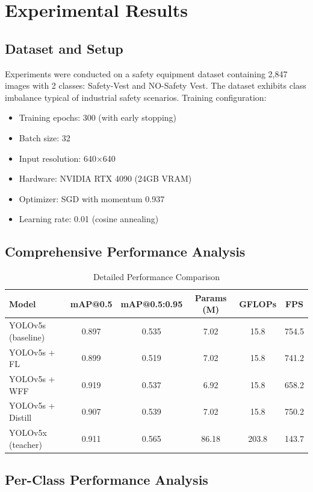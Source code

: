 \documentclass[journal]{IEEEtran}
\begin{document}
\section{Experimental Results}

\subsection{Dataset and Setup}

Experiments were conducted on a safety equipment dataset containing 2,847 images with 2 classes: Safety-Vest and NO-Safety Vest. The dataset exhibits class imbalance typical of industrial safety scenarios. Training configuration:

\begin{itemize}
\item Training epochs: 300 (with early stopping)
\item Batch size: 32
\item Input resolution: 640×640
\item Hardware: NVIDIA RTX 4090 (24GB VRAM)
\item Optimizer: SGD with momentum 0.937
\item Learning rate: 0.01 (cosine annealing)
\end{itemize}

\subsection{Comprehensive Performance Analysis}

\begin{table}[h]
\centering
\caption{Detailed Performance Comparison}
\begin{tabular}{|l|c|c|c|c|c|}
\hline
Model & mAP@0.5 & mAP@0.5:0.95 & Params (M) & GFLOPs & FPS \\
\hline
YOLOv5s (baseline) & 0.897 & 0.535 & 7.02 & 15.8 & 754.5 \\
YOLOv5s + FL & 0.899 & 0.519 & 7.02 & 15.8 & 741.2 \\
YOLOv5s + WFF & 0.919 & 0.537 & 6.92 & 15.8 & 658.2 \\
YOLOv5s + Distill & 0.907 & 0.539 & 7.02 & 15.8 & 750.2 \\
YOLOv5x (teacher) & 0.911 & 0.565 & 86.18 & 203.8 & 143.7 \\
\hline
\end{tabular}
\end{table}

\subsection{Per-Class Performance Analysis}
\end{document}
